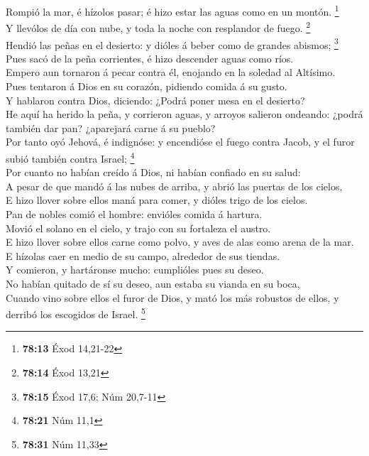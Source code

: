  Rompió la mar, é hízolos pasar; é hizo estar las aguas
como en un montón. \footnote{\textbf{78:13} Éxod 14,21-22}\\
 Y llevólos de día con nube, y toda la noche con resplandor
de fuego. \footnote{\textbf{78:14} Éxod 13,21}\\
 Hendió las peñas en el desierto: y dióles á beber como de
grandes abismos; \footnote{\textbf{78:15} Éxod 17,6; Núm 20,7-11}\\
 Pues sacó de la peña corrientes, é hizo descender aguas
como ríos.\\
 Empero aun tornaron á pecar contra él, enojando en la
soledad al Altísimo.\\
 Pues tentaron á Dios en su corazón, pidiendo comida á su
gusto.\\
 Y hablaron contra Dios, diciendo: ¿Podrá poner mesa en el
desierto?\\
 He aquí ha herido la peña, y corrieron aguas, y arroyos
salieron ondeando: ¿podrá también dar pan? ¿aparejará carne á su
pueblo?\\
 Por tanto oyó Jehová, é indignóse: y encendióse el fuego
contra Jacob, y el furor subió también contra Israel; \footnote{\textbf{78:21}
  Núm 11,1}\\
 Por cuanto no habían creído á Dios, ni habían confiado en
su salud:\\
 A pesar de que mandó á las nubes de arriba, y abrió las
puertas de los cielos,\\
 E hizo llover sobre ellos maná para comer, y dióles trigo
de los cielos.\\
 Pan de nobles comió el hombre: envióles comida á
hartura.\\
 Movió el solano en el cielo, y trajo con su fortaleza el
austro.\\
 E hizo llover sobre ellos carne como polvo, y aves de alas
como arena de la mar.\\
 E hízolas caer en medio de su campo, alrededor de sus
tiendas.\\
 Y comieron, y hartáronse mucho: cumplióles pues su
deseo.\\
 No habían quitado de sí su deseo, aun estaba su vianda en
su boca,\\
 Cuando vino sobre ellos el furor de Dios, y mató los más
robustos de ellos, y derribó los escogidos de Israel. \footnote{\textbf{78:31}
  Núm 11,33}\\

